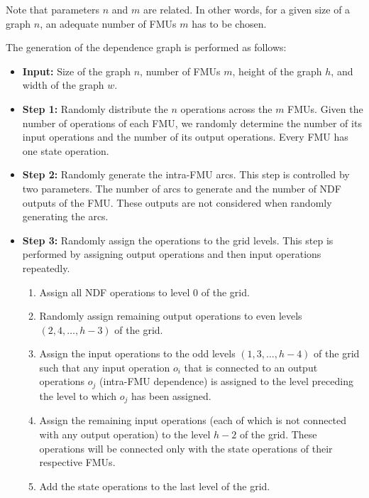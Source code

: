 Note that parameters $n$ and $m$ are related. In other words, for a given size of a graph $n$, an adequate number of FMUs $m$ has to be chosen. 

The generation of the dependence graph is performed as follows:
\begin{itemize}
\item \textbf{Input:} Size of the graph $n$, number of FMUs $m$, height of the graph $h$, and width of the graph $w$. %
\item \textbf{Step 1:} Randomly distribute the $n$ operations across the $m$ FMUs. Given the number of operations of each FMU, we randomly determine the number of its input operations and the number of its output operations. Every FMU has one state operation.
\item \textbf{Step 2:} Randomly generate the intra-FMU arcs. This step is controlled by two parameters.  The number of arcs to generate and the number of NDF outputs of the FMU. These outputs are not considered when randomly generating the arcs.
\item \textbf{Step 3:} Randomly assign the operations to the grid levels. This step is performed by assigning output operations and then input operations repeatedly.
\begin{enumerate}
\item Assign all NDF operations to level $0$ of the grid.
\item Randomly assign remaining output operations to even levels $(2, 4, \ldots, h-3)$ of the grid.
\item Assign the input operations to the odd levels $(1, 3, \ldots, h-4)$ of the grid such that any input operation $o_i$ that is connected to an output operations $o_j$ (intra-FMU dependence) is assigned to the level preceding the level to which $o_j$ has been assigned. 
\item Assign the remaining input operations (each of which is not connected with any output operation) to the level $h-2$ of the grid. These operations will be connected only with the state operations of their respective FMUs.
\item Add the state operations to the last level of the grid.

\end{enumerate}
\end{itemize}
